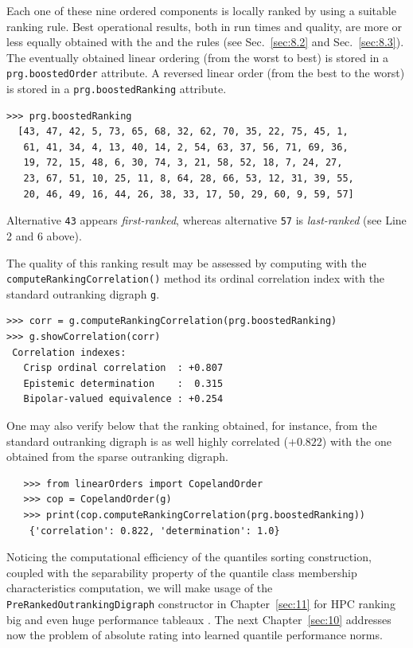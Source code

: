 Each one of these nine ordered components is locally ranked by using a suitable ranking rule. Best operational results, both in run times and quality, are more or less equally obtained with the \Copeland and the \NetFlows rules (see Sec.~\ref{sec:8.2} and Sec.~\ref{sec:8.3}). The eventually obtained linear ordering (from the worst to best) is stored in a \texttt{prg.boostedOrder} attribute. A reversed linear order (from the best to the worst) is stored in a \texttt{prg.boostedRanking} attribute.
  \begin{lstlisting}
>>> prg.boostedRanking
  [43, 47, 42, 5, 73, 65, 68, 32, 62, 70, 35, 22, 75, 45, 1,
   61, 41, 34, 4, 13, 40, 14, 2, 54, 63, 37, 56, 71, 69, 36,
   19, 72, 15, 48, 6, 30, 74, 3, 21, 58, 52, 18, 7, 24, 27,
   23, 67, 51, 10, 25, 11, 8, 64, 28, 66, 53, 12, 31, 39, 55,
   20, 46, 49, 16, 44, 26, 38, 33, 17, 50, 29, 60, 9, 59, 57]
\end{lstlisting}

Alternative \texttt{43} appears \emph{first-ranked}, whereas alternative \texttt{57} is \emph{last-ranked} (see Line 2 and 6 above).

The quality of this ranking result may be assessed by computing with the \texttt{computeRankingCorrelation()} method its ordinal correlation index with the standard outranking digraph \texttt{g}.  
\begin{lstlisting}
>>> corr = g.computeRankingCorrelation(prg.boostedRanking)
>>> g.showCorrelation(corr)
 Correlation indexes:
   Crisp ordinal correlation  : +0.807
   Epistemic determination    :  0.315
   Bipolar-valued equivalence : +0.254
\end{lstlisting}

One may also verify below that the \Copeland ranking obtained, for instance, from the standard outranking digraph is as well highly correlated ($+0.822$) with the one obtained from the sparse outranking digraph.
\begin{lstlisting}
   >>> from linearOrders import CopelandOrder
   >>> cop = CopelandOrder(g)
   >>> print(cop.computeRankingCorrelation(prg.boostedRanking))
    {'correlation': 0.822, 'determination': 1.0}
\end{lstlisting}

\vspace{\baselineskip}
Noticing the computational efficiency of the quantiles sorting construction, coupled with the separability property of the quantile class membership characteristics computation, we will make usage of the \texttt{PreRankedOutrankingDigraph} constructor in Chapter~\ref{sec:11} for HPC ranking big and even huge performance tableaux \citep{BIS-2016}. The next Chapter~\ref{sec:10} addresses now the problem of absolute rating into learned quantile performance norms.

%


 
